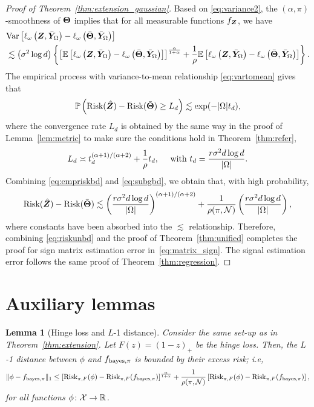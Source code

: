 \documentclass[11pt]{article}
\theoremstyle{plain}
\newtheorem{lem}{Lemma}
\theoremstyle{definition}
\def\bayespif{f_{\textup{bayes},\pi}}
\def\riskF{\textup{Risk}_{\pi,F}}
\begin{document}
\begin{proof}[Proof of Theorem~\ref{thm:extension_gaussian}]
Based on \eqref{eq:variance2}, the $(\alpha,\pi)$-smoothness of $\bm{\Theta}$ implies that for all measurable functions $f_{\bm Z}$, we have
\begin{align}\label{eq:vartomean}
&\text{Var}\left[\ell_\omega\left(\bm Z,\bar {\bm Y}_\Omega\right)-\ell_\omega\left(\bar{\bm{\Theta}},\bar{\bm Y}_\Omega\right)\right]\\&\lesssim \left(\sigma^2\log d\right) \left\{\left[\mathbb{E}\left[\ell_\omega\left(\bm Z,\bar {\bm Y}_\Omega\right)-\ell_\omega\left(\bar{\bm{\Theta}},\bar{\bm Y}_\Omega\right)\right]\right]^{\alpha\over1+\alpha}+\frac{1}{\rho}\mathbb{E}\left[\ell_\omega\left(\bm Z,\bar {\bm Y}_\Omega\right)-\ell_\omega\left(\bar{\bm{\Theta}},\bar{\bm Y}_\Omega\right)\right]\right\}.
\end{align}
The empirical process with variance-to-mean relationship \eqref{eq:vartomean} gives that
\begin{align}\label{eq:empriskbd}
\mathbb{P	}\left(\text{Risk}(\hat{\bm Z})-\text{Risk}(\bar{\bm{\Theta}})\geq L_d\right)\lesssim \exp(-|\Omega|t_d),
\end{align}
where the convergence rate $L_d$ is obtained by the same way in the proof of Lemma~\ref{lem:metric} to make sure the conditions hold in Theorem~\ref{thm:refer},  
\begin{align}\label{eq:subgbd}
L_d\asymp t_d^{(\alpha+1)/(\alpha+2)}+\frac{1}{\rho}t_d,\quad\text{ with } t_d =  {r \sigma^2 d\log d  \over |\Omega|}.
\end{align}
Combining \eqref{eq:empriskbd} and \eqref{eq:subgbd}, we obtain that, with high probability, 
\begin{align}\label{eq:riskunbd}
   \text{Risk}(\hat{\bm Z})-\text{Risk}(\bar{\bm{\Theta}})\lesssim \left( {r \sigma^2  d\log d \over |\Omega|}\right)^{(\alpha+1)/(\alpha+2)}+\frac{1}{\rho(\pi,\mathcal{N})} \left({r \sigma^2  d \log d\over |\Omega|} \right),
\end{align} 
where constants have been absorbed into the $\lesssim$ relationship. Therefore, combining \eqref{eq:riskunbd} and the proof of Theorem~\ref{thm:unified} completes the proof for sign matrix estimation error in~\eqref{eq:matrix_sign}. The signal estimation error follows the same proof of Theorem~\ref{thm:regression}.
\end{proof}

\clearpage
\section{Auxiliary lemmas}\label{sec:auxiliary}

\begin{lem}[Hinge loss and $L$-1 distance]\label{lem:hingeL1} Consider the same set-up as in Theorem~\ref{thm:extension}. Let $F(z)=(1-z)_{+}$ be the hinge loss. Then, the $L$-1 distance between $\phi$ and $\bayespif$ is bounded by their excess risk; i.e,
\begin{equation}\label{eq:L}
\onenormSize{}{\phi-\bayespif}
\leq
\left[\riskF(\phi)-\riskF(\bayespif)\right]^{\alpha\over 1+\alpha}+
 {1\over \rho(\pi, \tN)}\left[\riskF(\phi)-\riskF(\bayespif)\right],
\end{equation}
for all functions $\phi\colon \mathcal{X}\to\mathbb{R}$.
\end{lem}
\end{document}
